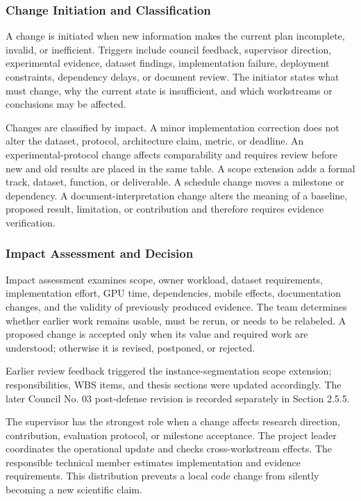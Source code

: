 \documentclass[12pt,a4paper]{report}
\newenvironment{revisionblock}{\begin{snugshade}\noindent}{\end{snugshade}}
\begin{document}
\endgroup
\subsubsection{Change Initiation and Classification}
A change is initiated when new information makes the current plan incomplete, invalid, or inefficient. Triggers include council feedback, supervisor direction, experimental evidence, dataset findings, implementation failure, deployment constraints, dependency delays, or document review. The initiator states what must change, why the current state is insufficient, and which workstreams or conclusions may be affected.\par
Changes are classified by impact. A minor implementation correction does not alter the dataset, protocol, architecture claim, metric, or deadline. An experimental-protocol change affects comparability and requires review before new and old results are placed in the same table. A scope extension adds a formal track, dataset, function, or deliverable. A schedule change moves a milestone or dependency. A document-interpretation change alters the meaning of a baseline, proposed result, limitation, or contribution and therefore requires evidence verification.\par
\subsubsection{Impact Assessment and Decision}
Impact assessment examines scope, owner workload, dataset requirements, implementation effort, GPU time, dependencies, mobile effects, documentation changes, and the validity of previously produced evidence. The team determines whether earlier work remains usable, must be rerun, or needs to be relabeled. A proposed change is accepted only when its value and required work are understood; otherwise it is revised, postponed, or rejected.\par
\begin{revisionblock}
Earlier review feedback triggered the instance-segmentation scope extension; responsibilities, WBS items, and thesis sections were updated accordingly. The later Council No. 03 post-defense revision is recorded separately in Section 2.5.5.
\end{revisionblock}
The supervisor has the strongest role when a change affects research direction, contribution, evaluation protocol, or milestone acceptance. The project leader coordinates the operational update and checks cross-workstream effects. The responsible technical member estimates implementation and evidence requirements. This distribution prevents a local code change from silently becoming a new scientific claim.\par
\end{document}
